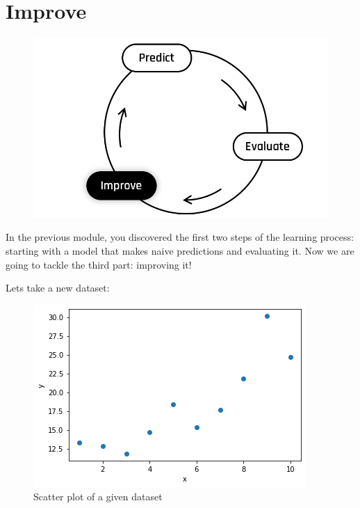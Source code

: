 
\section*{Improve}
\begin{figure}[!h]
  \centering
  \includegraphics[scale=0.25]{assets/Improve2.png}
\end{figure}

In the previous module, you discovered the first two steps of the learning process:
starting with a model that makes naive predictions and evaluating it.
Now we are going to tackle the third part: improving it!  


Lets take a new dataset:

\begin{figure}[!h]
  \centering
  \includegraphics[scale=0.6]{assets/ex03_interlude_plot.png}
  \caption{Scatter plot of a given dataset}
\end{figure}

